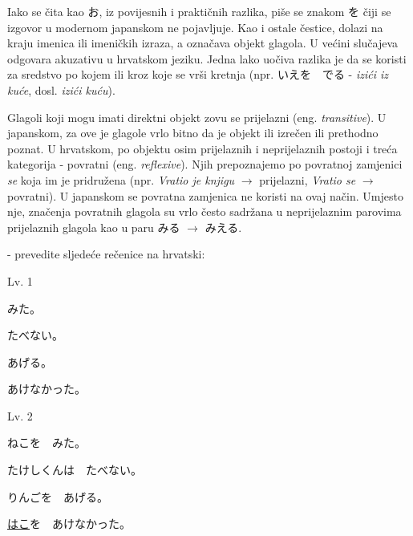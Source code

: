 	Iako se čita kao お, iz povijesnih i praktičnih razlika, piše se znakom を čiji se izgovor u modernom japanskom ne pojavljuje. Kao i ostale čestice, dolazi na kraju imenica ili imeničkih izraza, a označava objekt glagola. U većini slučajeva odgovara akuzativu u hrvatskom jeziku. Jedna lako uočiva razlika je da se koristi za sredstvo po kojem ili kroz koje se vrši kretnja (npr. いえを　でる - \textit{izići iz kuće}, dosl. \textit{izići kuću}).
	
	Glagoli koji mogu imati direktni objekt zovu se prijelazni (eng. \textit{transitive}). U japanskom, za ove je glagole vrlo bitno da je objekt ili izrečen ili prethodno poznat. U hrvatskom, po objektu osim prijelaznih i neprijelaznih postoji i treća kategorija - povratni (eng. \textit{reflexive}). Njih prepoznajemo po povratnoj zamjenici \textit{se} koja im je pridružena (npr. \textit{Vratio je knjigu} $\rightarrow$ prijelazni, \textit{Vratio se} $\rightarrow$ povratni). U japanskom se povratna zamjenica ne koristi na ovaj način. Umjesto nje, značenja povratnih glagola su vrlo često sadržana u neprijelaznim parovima prijelaznih glagola kao u paru みる $\rightarrow$ みえる.
	
	
	\begin{reibun}
	\end{reibun}

	 - prevedite sljedeće rečenice na hrvatski:

	\begin{mondai}{Lv. 1}
		\item みた。
		\item たべない。
		\item あげる。
		\item あけなかった。
	\end{mondai}

	\vspace{-10pt}
	\begin{mondai}{Lv. 2}
		\item ねこを　みた。
		\item たけし\footnotemark[4]くんは　たべない。
		\item りんごを　あげる。
		\item \underline{はこ}を　あけなかった。
	\end{mondai}

